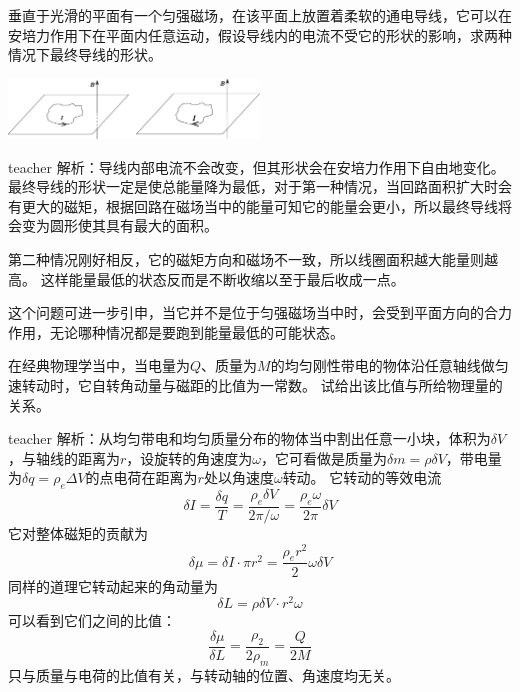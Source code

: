 \begin{example}
垂直于光滑的平面有一个匀强磁场，在该平面上放置着柔软的通电导线，它可以在安培力作用下在平面内任意运动，假设导线内的电流不受它的形状的影响，求两种情况下最终导线的形状。
\begin{flushright}
\includegraphics[width=0.5\textwidth]{images/mag-6.pdf} 
\end{flushright}
\begin{taggedblock}{teacher}
\noindent
解析：导线内部电流不会改变，但其形状会在安培力作用下自由地变化。
最终导线的形状一定是使总能量降为最低，对于第一种情况，当回路面积扩大时会有更大的磁矩，根据回路在磁场当中的能量可知它的能量会更小，所以最终导线将会变为圆形使其具有最大的面积。

第二种情况刚好相反，它的磁矩方向和磁场不一致，所以线圈面积越大能量则越高。
这样能量最低的状态反而是不断收缩以至于最后收成一点。

这个问题可进一步引申，当它并不是位于匀强磁场当中时，会受到平面方向的合力作用，无论哪种情况都是要跑到能量最低的可能状态。

\end{taggedblock}
\end{example}

\begin{example}
在经典物理学当中，当电量为$Q$、质量为$M$的均匀刚性带电的物体沿任意轴线做匀速转动时，它自转角动量与磁距的比值为一常数。
试给出该比值与所给物理量的关系。
\begin{taggedblock}{teacher}
\noindent
解析：从均匀带电和均匀质量分布的物体当中割出任意一小块，体积为$\delta V$，与轴线的距离为$r$，设旋转的角速度为$\omega$，它可看做是质量为$\delta m = \rho\delta V$，带电量为$\delta q = \rho_e\Delta V$的点电荷在距离为$r$处以角速度$\omega $转动。
它转动的等效电流
\[\delta I = \frac{\delta q}{T} = \frac{\rho_e \delta V }{2\pi/\omega} =\frac{\rho_e \omega}{2\pi}\delta V  \]
它对整体磁矩的贡献为
\[
\delta \mu = \delta I \cdot \pi r^2 = \frac{\rho_e  r^2}{2}\omega\delta V 
\]
同样的道理它转动起来的角动量为
\[
\delta L = \rho \delta V \cdot r^2\omega
\]
可以看到它们之间的比值：
\[
\frac{\delta \mu}{\delta L} = \frac{\rho_2}{2\rho_m} = \frac{Q}{2M}
\]
只与质量与电荷的比值有关，与转动轴的位置、角速度均无关。

\end{taggedblock}
\end{example}


